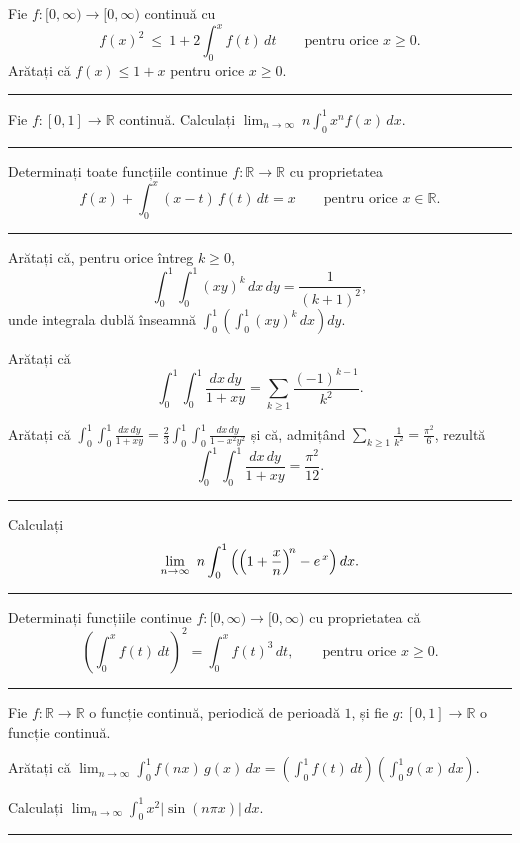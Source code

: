 Fie $f:[0,\infty)\to[0,\infty)$ continuă cu
\[ f(x)^2\ \le\ 1+2\int_0^xf(t)\,dt\qquad\text{pentru orice }x\ge0 . \]
Arătați că $f(x)\le1+x$ pentru orice $x\ge0$.
\vspace{1mm}\hrule

Fie $f:[0,1]\to\mathbb{R}$ continuă. Calculați $\displaystyle\lim_{n\to\infty}\ n\int_0^1x^nf(x)\,dx$.
\vspace{1mm}\hrule

Determinați toate funcțiile continue $f:\mathbb{R}\to\mathbb{R}$ cu proprietatea
\[ f(x)+\int_{0}^{x}(x-t)\,f(t)\,dt=x\qquad\text{pentru orice }x\in\mathbb{R} . \]
\vspace{1mm}\hrule

\begin{parti}
  \item Arătați că, pentru orice întreg $k\ge0$,
  \[ \int_{0}^{1}\!\!\int_{0}^{1}(xy)^{k}\,dx\,dy=\frac{1}{(k+1)^{2}} , \]
  unde integrala dublă înseamnă $\displaystyle\int_{0}^{1}\left(\int_{0}^{1}(xy)^{k}\,dx\right)dy$.
  \item Arătați că
  \[ \int_{0}^{1}\!\!\int_{0}^{1}\frac{dx\,dy}{1+xy}=\sum_{k\ge1}\frac{(-1)^{k-1}}{k^{2}} . \]
  \item Arătați că $\displaystyle\int_{0}^{1}\!\!\int_{0}^{1}\frac{dx\,dy}{1+xy}=\frac{2}{3}\int_{0}^{1}\!\!\int_{0}^{1}\frac{dx\,dy}{1-x^{2}y^{2}}$ și că, admițând $\displaystyle\sum_{k\ge1}\frac{1}{k^{2}}=\frac{\pi^{2}}{6}$, rezultă
  \[ \int_{0}^{1}\!\!\int_{0}^{1}\frac{dx\,dy}{1+xy}=\frac{\pi^{2}}{12} . \]
\end{parti}
\vspace{1mm}\hrule

Calculați
\[ \lim_{n\to\infty}\ n\int_{0}^{1}\left(\Bigl(1+\frac{x}{n}\Bigr)^{\!n}-e^{\,x}\right)dx . \]
\vspace{1mm}\hrule

Determinați funcțiile continue $f:[0,\infty)\to[0,\infty)$ cu proprietatea că
\[ \left(\int_0^x f(t)\,dt\right)^{\!2} = \int_0^x f(t)^3\,dt,
   \qquad \text{pentru orice } x\ge 0. \]
\vspace{1mm}\hrule

Fie $f:\mathbb{R}\to\mathbb{R}$ o funcție continuă, periodică de perioadă $1$, și fie
$g:[0,1]\to\mathbb{R}$ o funcție continuă.
\begin{parti}
  \item Arătați că
        $\displaystyle\lim_{n\to\infty}\int_0^1 f(nx)\,g(x)\,dx
        = \left(\int_0^1 f(t)\,dt\right)\left(\int_0^1 g(x)\,dx\right)$.
  \item Calculați $\displaystyle\lim_{n\to\infty}\int_0^1 x^2\left|\sin(n\pi x)\right|\,dx$.
\end{parti}
\vspace{1mm}\hrule

